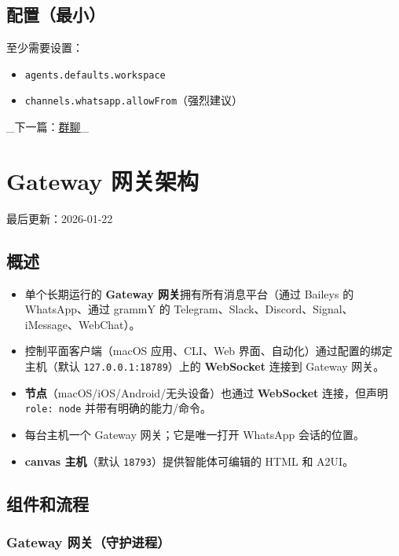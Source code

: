 \subsection{配置（最小）}


至少需要设置：

\begin{itemize}
  \item \texttt{agents.defaults.workspace}
  \item \texttt{channels.whatsapp.allowFrom}（强烈建议）
\end{itemize}


\hrulefill


\_下一篇：\href{/channels/group-messages}{群聊}\_ 


\clearpage

\section{Gateway 网关架构}


最后更新：2026-01-22

\subsection{概述}


\begin{itemize}
  \item 单个长期运行的 \textbf{Gateway 网关}拥有所有消息平台（通过 Baileys 的 WhatsApp、通过 grammY 的 Telegram、Slack、Discord、Signal、iMessage、WebChat）。
  \item 控制平面客户端（macOS 应用、CLI、Web 界面、自动化）通过配置的绑定主机（默认 \texttt{127.0.0.1:18789}）上的 \textbf{WebSocket} 连接到 Gateway 网关。
  \item \textbf{节点}（macOS/iOS/Android/无头设备）也通过 \textbf{WebSocket} 连接，但声明 \texttt{role: node} 并带有明确的能力/命令。
  \item 每台主机一个 Gateway 网关；它是唯一打开 WhatsApp 会话的位置。
  \item \textbf{canvas 主机}（默认 \texttt{18793}）提供智能体可编辑的 HTML 和 A2UI。
\end{itemize}


\subsection{组件和流程}


\subsubsection{Gateway 网关（守护进程）}


